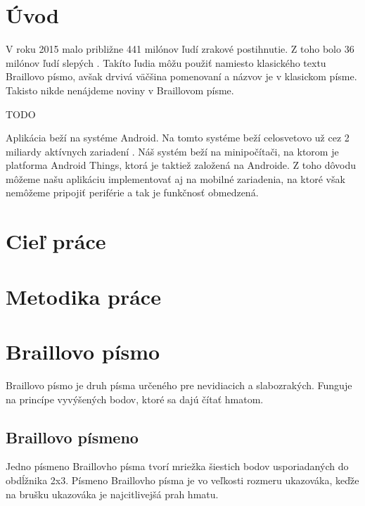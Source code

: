 \documentclass{template/socthesis}
\author{Juraj Kulich}
\begin{document}
	
\maketitle
{}

\tableofcontents

\chapter*{Úvod}
V roku 2015 malo približne 441 milónov ľudí zrakové postihnutie. Z toho bolo 36 milónov ľudí slepých \cite{bourne2017magnitude}. Takíto ľudia môžu použiť namiesto klasického textu Braillovo písmo, avšak drvivá väčšina pomenovaní a názvov je v klasickom písme. Takisto nikde nenájdeme noviny v Braillovom písme.

TODO

Aplikácia beží na systéme Android. Na tomto systéme beží celosvetovo už cez 2 miliardy aktívnych zariadení \cite{ng_2017}. Náš systém beží na minipočítači, na ktorom je platforma Android Things, ktorá je taktiež založená na Androide. Z toho dôvodu môžeme našu aplikáciu implementovať aj na mobilné zariadenia, na ktoré však nemôžeme pripojiť periférie a tak je funkčnosť obmedzená.
\newpage
\chapter*{Cieľ práce}
\newpage
\chapter*{Metodika práce}
\newpage
\chapter{Braillovo písmo}
Braillovo písmo je druh písma určeného pre nevidiacich a slabozrakých. Funguje na princípe vyvýšených bodov, ktoré sa dajú čítať hmatom.
\section{Braillovo písmeno}
Jedno písmeno Braillovho písma tvorí mriežka šiestich bodov usporiadaných do obdĺžnika 2x3. Písmeno Braillovho písma je vo veľkosti rozmeru ukazováka, keďže na brušku ukazováka je najcitlivejšá prah hmatu.
\end{document}
